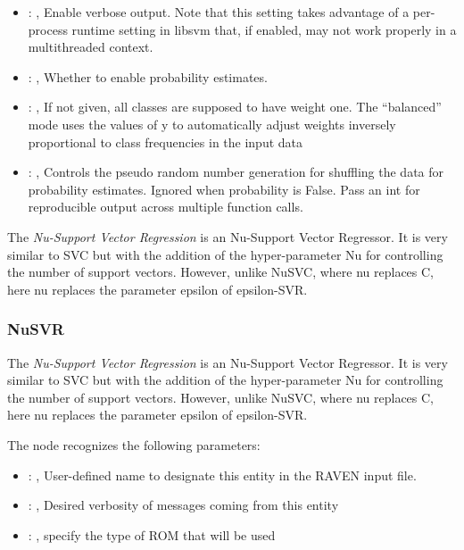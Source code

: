 \begin{itemize}
    \item {}: , 
      Enable verbose output. Note that this setting takes advantage
      of a per-process runtime setting in libsvm that, if enabled, may not
      work properly in a multithreaded context.

    \item {}: , 
      Whether to enable probability estimates.

    \item {}: \xmlDesc{[balanced]}, 
      If not given, all classes are supposed to have weight one.
      The “balanced” mode uses the values of y to automatically adjust weights
      inversely proportional to class frequencies in the input data

    \item {}: , 
      Controls the pseudo random number generation for shuffling
      the data for probability estimates. Ignored when probability is False.
      Pass an int for reproducible output across multiple function calls.
  \end{itemize}
 The  \textit{Nu-Support Vector Regression} is an Nu-Support Vector Regressor.
 It is very similar to SVC but with the addition of the hyper-parameter Nu for controlling the
 number of support vectors. However, unlike NuSVC, where nu replaces C,
 here nu replaces the parameter epsilon of epsilon-SVR.

\subsubsection{NuSVR}
  The  \textit{Nu-Support Vector Regression} is an Nu-Support Vector Regressor.
  It is very similar to SVC but with the addition of the hyper-parameter Nu for controlling the
  number of support vectors. However, unlike NuSVC, where nu replaces C,
  here nu replaces the parameter epsilon of epsilon-SVR.

  The  node recognizes the following parameters:
    \begin{itemize}
      \item {}: , 
        User-defined name to designate this entity in the RAVEN input file.
      \item {}: , 
        Desired verbosity of messages coming from this entity
      \item {}: , 
        specify the type of ROM that will be used
  \end{itemize}

